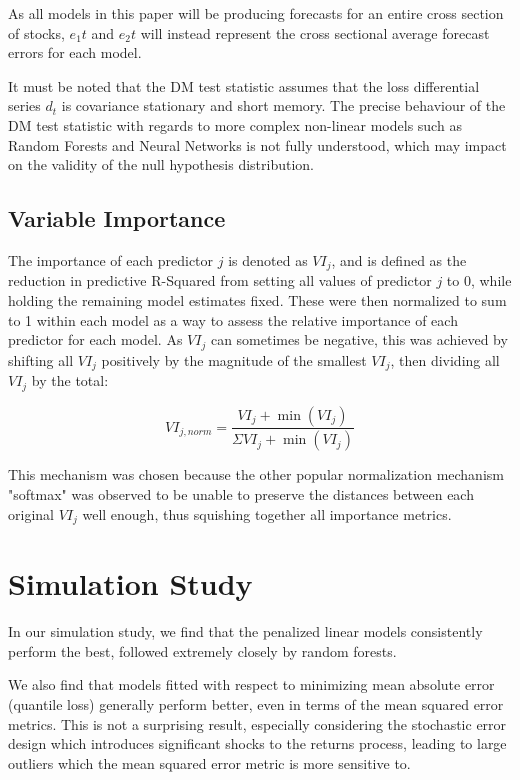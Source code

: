 \documentclass[a4paper, table]{article}
\begin{document}
As all models in this paper will be producing forecasts for an entire cross section of stocks, $e_1t$ and $e_2t$ will instead represent the cross sectional average forecast errors for each model.

It must be noted that the DM test statistic assumes that the loss differential series $d_t$ is covariance stationary and short memory. The precise behaviour of the DM test statistic with regards to more complex non-linear models such as Random Forests and Neural Networks is not fully understood, which may impact on the validity of the null hypothesis distribution. 

\subsection{Variable Importance}

The importance of each predictor $j$ is denoted as $VI_j$, and is defined as the reduction in predictive R-Squared from setting all values of predictor $j$ to 0, while holding the remaining model estimates fixed. These were then normalized to sum to 1 within each model as a way to assess the relative importance of each predictor for each model. As $VI_j$ can sometimes be negative, this was achieved by shifting all $VI_j$ positively by the magnitude of the smallest $VI_j$, then dividing all $VI_j$ by the total:

\begin{equation}
	VI_{j, norm} = \frac{VI_j + \operatorname{min}(VI_j)}
	{\Sigma VI_j + \operatorname{min}(VI_j)}
\end{equation}

This mechanism was chosen because the other popular normalization mechanism "softmax" was observed to be unable to preserve the distances between each original $VI_j$ well enough, thus squishing together all importance metrics.

\section{Simulation Study}


In our simulation study, we find that the penalized linear models consistently perform the best, followed extremely closely by random forests. 

We also find that models fitted with respect to minimizing mean absolute error (quantile loss) generally perform better, even in terms of the mean squared error metrics. This is not a surprising result, especially considering the stochastic error design which introduces significant shocks to the returns process, leading to large outliers which the mean squared error metric is more sensitive to. 
\end{document}
